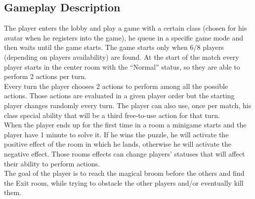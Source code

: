\subsection{Gameplay Description}
The player enters the lobby and play a game with a certain class (chosen for his avatar when he registers into the game), he queue in a specific game mode and then waits until the game starts. The game starts only when 6/8 players (depending on players availability) are found. At the start of the match every player starts in the center room with the “Normal” status, so they are able to perform 2 actions per turn.\\
Every turn the player chooses 2 actions to perform among all the possible actions. Those actions are evaluated in a given player order but the starting player changes randomly every turn. The player can also use, once per match, his class special ability that will be a third free-to-use action for that turn.\\
When the player ends up for the first time in a room a minigame starts and the player have 1 minute to solve it. If he wins the puzzle, he will activate the positive effect of the room in which he lands, otherwise he will activate the negative effect. Those rooms effects can change players’ statuses that will affect their ability to perform actions. \\
The goal of the player is to reach the magical broom before the others and find the Exit room, while trying to obstacle the other players and/or eventually kill them.\\